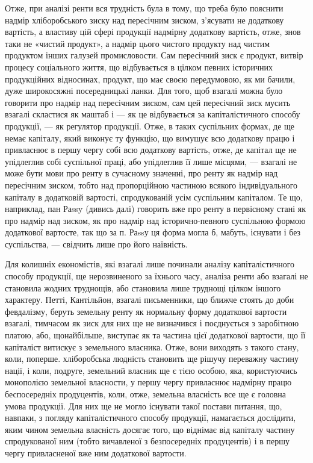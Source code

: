 Отже, при аналізі ренти вся трудність була в тому, що треба було
пояснити надмір хліборобського зиску над пересічним зиском, з’ясувати не додаткову
вартість, а властиву цій сфері продукції надмірну додаткову вартість,
отже, знов таки не «чистий продукт», а надмір цього чистого продукту над
чистим продуктом інших галузей промисловости. Сам пересічний зиск є продукт,
витвір процесу соціального життя, що відбувається в цілком певних історичних
продукційних відносинах, продукт, що має своєю передумовою, як ми
бачили, дуже широкосяжні посередницькі ланки. Для того, щоб взагалі можна було
говорити про надмір над пересічним зиском, сам цей пересічний зиск мусить
взагалі скластися як маштаб і — як це відбувається за капіталістичного способу
продукції, — як регулятор продукції. Отже, в таких суспільних формах, де ще
немає капіталу, який виконує ту функцію, що вимушує всю додаткову працю
і привласнює в першу чергу собі всю додаткову вартість, отже, де капітал ще
не упідлеглив собі суспільної праці, або упідлеглив її лише місцями, — взагалі
не може бути мови про ренту в сучасному значенні, про ренту як надмір
над пересічним зиском, тобто над пропорційною частиною всякого індивідуального
капіталу в додатковій вартості, спродукованій усім суспільним капіталом. Те
що, наприклад, пан Раssy (дивись далі) говорить вже про ренту в первісному стані
як про надмір над зиском, як про надмір над історично-певного суспільною
формою додаткової вартосте, так що за п. Раssу ця форма могла б, мабуть,
існувати і без суспільства, — свідчить лише про його наївність.

Для колишніх економістів, які взагалі лише починали аналізу капіталістичного
способу продукції, ще нерозвиненого за їхнього часу, аналіза ренти
або взагалі не становила жодних труднощів, або становила лише труднощі цілком
іншого характеру. Петті, Кантільйон, взагалі письменники, що ближче стоять
до доби февдалізму, беруть земельну ренту як нормальну форму додаткової
вартости взагалі, тимчасом як зиск для них ще не визначився і поєднується
з заробітною платою, або, щонайбільше, виступає як та частина цієї
додаткової вартости, що її капіталіст витискує з земельного власника. Отже, вони
виходять з такого стану, коли, поперше. хліборобська людність становить ще рішучу
переважну частину нації, і коли, подруге, земельний власник ще є тією
особою, яка, користуючись монополією земельної власности, у першу чергу привласнює
надмірну працю беспосередніх продуцентів, коли, отже, земельна власність
все ще є головна умова продукції. Для них ще не могло існувати такої
постави питання, що, навпаки, з погляду капіталістичного способу продукції,
намагається дослідити, яким чином земельна власність досягає того, що
віднімає від капіталу частину спродукованої ним (тобто вичавленої з безпосередніх
продуцентів) і в першу чергу привласненої вже ним додаткової вартости.

